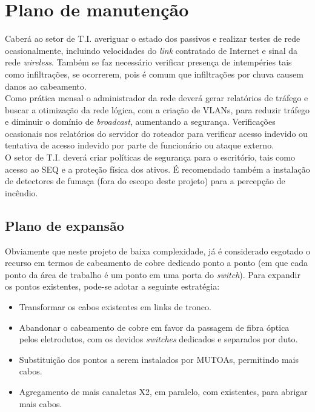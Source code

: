 \documentclass[	DIV=calc,%
							paper=a4,%
							fontsize=12pt,%
							onecolumn]{scrartcl}	 					%
\begin{document}
\section{Plano de manutenção}

Caberá ao setor de T.I. averiguar o estado dos passivos e realizar testes de rede ocasionalmente, incluindo velocidades do \textit{link} contratado de Internet e sinal da rede \textit{wireless}. Também se faz necessário verificar presença de intempéries tais como infiltrações, se ocorrerem, pois é comum que infiltrações por chuva causem danos ao cabeamento. 
\\

Como prática mensal o administrador da rede deverá gerar relatórios de tráfego e buscar a otimização da rede lógica, com a criação de VLANs, para reduzir tráfego e diminuir o domínio de \textit{broadcast}, aumentando a segurança. Verificações ocasionais nos relatórios do servidor do roteador para verificar acesso indevido ou tentativa de acesso indevido por parte de funcionário ou ataque externo.
\\

O setor de T.I. deverá criar políticas de segurança para o escritório, tais como acesso ao SEQ e a proteção física dos ativos. É recomendado também a instalação de detectores de fumaça (fora do escopo deste projeto) para a percepção de incêndio.

\subsection{Plano de expansão}

Obviamente que neste projeto de baixa complexidade, já é considerado esgotado o recurso em termos de cabeamento de cobre dedicado ponto a ponto (em que cada ponto da área de trabalho é um ponto em uma porta do \textit{switch}). Para expandir os pontos existentes, pode-se adotar a seguinte estratégia:
\\

\begin{itemize}
	\item Transformar os cabos existentes em links de tronco.
	\\
	\item Abandonar o cabeamento de cobre em favor da passagem de fibra óptica pelos eletrodutos, com os devidos \textit{switches} dedicados e separados por duto.
	\\
	\item Substituição dos pontos a serem instalados por MUTOAs, permitindo mais cabos.
	\\
	\item Agregamento de mais canaletas X2, em paralelo, com existentes, para abrigar mais cabos.
\end{itemize}
\end{document}
